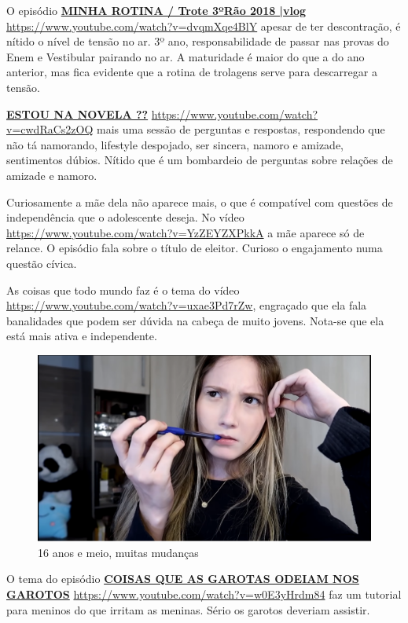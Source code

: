 O episódio \href{https://www.youtube.com/watch?v=dvqmXqe4BlY}{\textbf{\textbf{MINHA ROTINA / Trote 3ºRão 2018 |vlog}}} \url{https://www.youtube.com/watch?v=dvqmXqe4BlY} apesar de ter descontração, é nítido o nível de tensão no ar. 3º ano, responsabilidade de passar nas provas do Enem e Vestibular pairando no ar. A maturidade é maior do que a do ano anterior, mas fica evidente que a rotina de trolagens serve para descarregar a tensão.


\href{https://www.youtube.com/watch?v=cwdRaCs2zOQ}{\textbf{ESTOU NA NOVELA ??}} \url{https://www.youtube.com/watch?v=cwdRaCs2zOQ} mais uma sessão de perguntas e respostas, respondendo que não tá namorando, lifestyle despojado, ser sincera, namoro e amizade, sentimentos dúbios. Nítido que é um bombardeio de perguntas sobre relações de amizade e namoro.

Curiosamente a mãe dela não aparece mais, o que é compatível com questões de independência que o adolescente deseja. No vídeo \url{https://www.youtube.com/watch?v=YzZEYZXPkkA} a mãe aparece só de relance. O episódio fala sobre o título de eleitor. Curioso o engajamento numa questão cívica.

As coisas que todo mundo faz é o tema do vídeo \url{https://www.youtube.com/watch?v=uxae3Pd7rZw}, engraçado que ela fala banalidades que podem ser dúvida na cabeça de muito jovens. Nota-se que ela está mais ativa e independente.

\begin{figure}[h!]
    \centering
    \includegraphics[width=0.7\linewidth]{fig/Zabetta-16-anos2}
    \caption{16 anos e meio, muitas mudanças}
    \label{fig:zabetta-16-anos2}
\end{figure}

O tema do episódio \href{https://www.youtube.com/watch?v=w0E3yHrdm84}{\textbf{COISAS QUE AS GAROTAS ODEIAM NOS GAROTOS}} \url{https://www.youtube.com/watch?v=w0E3yHrdm84} faz um tutorial para meninos do que irritam as meninas. Sério os garotos deveriam assistir.

